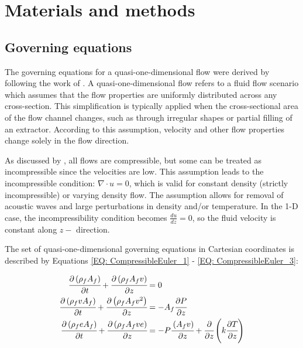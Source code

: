 \documentclass[a4paper,fleqn]{cas-dc}
\begin{document}

%
\section{Materials and methods} \label{CH: Materials and methods}

\subsection{Governing equations} \label{CH:Governing_equations_chapter}
The governing equations for a quasi-one-dimensional flow were derived by following the work of \citet{Anderson1995}. A quasi-one-dimensional flow refers to a fluid flow scenario which assumes that the flow properties are uniformly distributed across any cross-section. This simplification is typically applied when the cross-sectional area of the flow channel changes, such as through irregular shapes or partial filling of an extractor. According to this assumption, velocity and other flow properties change solely in the flow direction.

As discussed by \citet{Anderson2023}, all flows are compressible, but some can be treated as incompressible since the velocities are low. This assumption leads to the incompressible condition: $\nabla \cdot u =0$, which is valid for constant density (strictly incompressible) or varying density flow. The assumption allows for removal of acoustic waves and large perturbations in density and/or temperature. In the 1-D case, the incompressibility condition becomes $\frac{du}{dz} = 0$, so the fluid velocity is constant along $z-$ direction.

The set of quasi-one-dimensional governing equations in Cartesian coordinates is described by Equations \ref{EQ: CompressibleEuler_1} - \ref{EQ: CompressibleEuler_3}:

{\footnotesize
	\begin{align}
		\label{EQ: CompressibleEuler_1}
		\cfrac{\partial \left( \rho_f A_f \right) }{\partial t} + \cfrac{\partial \left( \rho_f A_f v \right)}{\partial z} &= 0 \\
		\cfrac{\partial \left( \rho_f v A_f \right) }{\partial t} + \cfrac{\partial \left( \rho_f A_f v^2 \right)}{\partial z} &= -A_f \cfrac{\partial P}{\partial z} \label{EQ: CompressibleEuler_2} \\
		\cfrac{\partial \left( \rho_f e A_f \right) }{\partial t} + \cfrac{\partial \left( \rho_f A_f v e\right)}{\partial z} &= -P\cfrac{\left( A_f v \right)}{\partial z} + \cfrac{\partial}{\partial z} \left( k \cfrac{\partial T}{\partial z} \right)   
		\label{EQ: CompressibleEuler_3}
	\end{align}  
}
\end{document}
